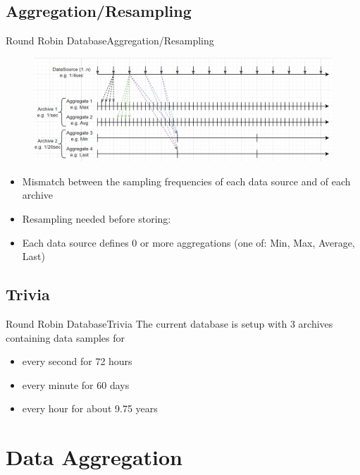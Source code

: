 \documentclass[t, 9pt, aspectratio=169]{beamer}
\begin{document}
    \subsection{Aggregation/Resampling}

    \begin{frame}{Round Robin Database}{Aggregation/Resampling}
        \begin{figure}
            \includegraphics[scale=0.35]{rrdb-structure.jpg}
        \end{figure}
        \begin{itemize}
            \item Mismatch between the sampling frequencies of each data source and of each archive
            \item Resampling needed before storing: 
            \item Each data source defines 0 or more aggregations (one of: Min, Max, Average, Last)
        \end{itemize}
    \end{frame}

    \subsection{Trivia}

    \begin{frame}{Round Robin Database}{Trivia}
        The current database is setup with 3 archives containing data samples for
        \begin{itemize}
            \item every second for 72 hours
            \item every minute for 60 days
            \item every hour for about 9.75 years\footnotemark
        \end{itemize}
    \end{frame}

    \section{Data Aggregation}
\end{document}
